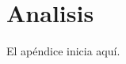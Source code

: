 
\chapter{Analisis}
\label{app:app01}

\setcounter{equation}{0}
\renewcommand{\theequation}{A.\arabic{equation}}

\setcounter{figure}{0}
\renewcommand{\thefigure}{A.\arabic{figure}}

\setcounter{table}{0}
\renewcommand{\thetable}{A.\arabic{table}}

El ap\'endice inicia aqu\'i.